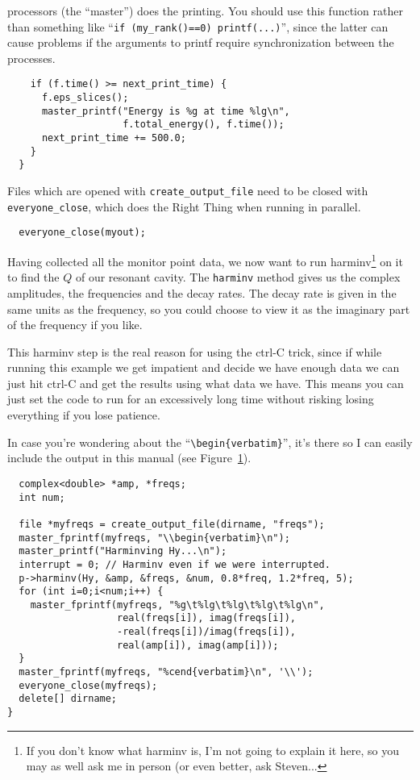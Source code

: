 processors (the ``master'') does the printing.  You should use this
function rather than something like
``\verb!if (my_rank()==0) printf(...)!'', since the latter can cause
problems if the arguments to printf require synchronization between the
processes.
\begin{verbatim}
    if (f.time() >= next_print_time) {
      f.eps_slices();
      master_printf("Energy is %g at time %lg\n",
                    f.total_energy(), f.time());
      next_print_time += 500.0;
    }
  }
\end{verbatim}
Files which are opened with \verb!create_output_file! need to be closed
with \verb!everyone_close!, which does the Right Thing when running in
parallel.
\begin{verbatim}
  everyone_close(myout);
\end{verbatim}
Having collected all the monitor point data, we now want to run
harminv\footnote{If you don't know what harminv is, I'm not going to
explain it here, so you may as well ask me in person (or even better, ask
Steven...} on it to find the $Q$ of our resonant cavity.  The
\verb!harminv! method gives us the complex amplitudes, the frequencies and
the decay rates.  The decay rate is given in the same units as the
frequency, so you could choose to view it as the imaginary part of the
frequency if you like.

This harminv step is the real reason for using the ctrl-C trick, since if
while running this example we get impatient and decide we have enough data
we can just hit ctrl-C and get the results using what data we have.  This
means you can just set the code to run for an excessively long time without
risking losing everything if you lose patience.
\begin{figure}
\label{complicated_figure}
\begin{center}
\end{center}
\end{figure}

In case you're wondering about the ``\verb!\begin{verbatim}!'', it's there
so I can easily include the output in this manual (see
Figure~\ref{complicated_figure}).
\begin{verbatim}
  complex<double> *amp, *freqs;
  int num;
  
  file *myfreqs = create_output_file(dirname, "freqs");
  master_fprintf(myfreqs, "\\begin{verbatim}\n");
  master_printf("Harminving Hy...\n");
  interrupt = 0; // Harminv even if we were interrupted.
  p->harminv(Hy, &amp, &freqs, &num, 0.8*freq, 1.2*freq, 5);
  for (int i=0;i<num;i++) {
    master_fprintf(myfreqs, "%g\t%lg\t%lg\t%lg\t%lg\n",
                   real(freqs[i]), imag(freqs[i]),
                   -real(freqs[i])/imag(freqs[i]),
                   real(amp[i]), imag(amp[i]));
  }
  master_fprintf(myfreqs, "%cend{verbatim}\n", '\\');
  everyone_close(myfreqs);
  delete[] dirname;
}
\end{verbatim}